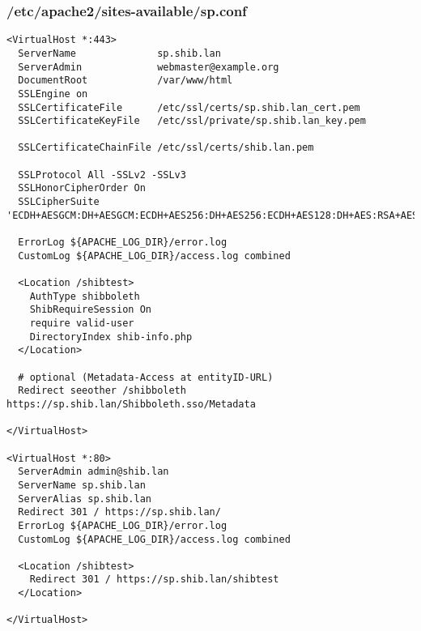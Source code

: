 \subsubsection{/etc/apache2/sites-available/sp.conf}
\begin{lstlisting}
<VirtualHost *:443>
  ServerName              sp.shib.lan
  ServerAdmin             webmaster@example.org
  DocumentRoot            /var/www/html
  SSLEngine on
  SSLCertificateFile      /etc/ssl/certs/sp.shib.lan_cert.pem
  SSLCertificateKeyFile   /etc/ssl/private/sp.shib.lan_key.pem
 
  SSLCertificateChainFile /etc/ssl/certs/shib.lan.pem
 
  SSLProtocol All -SSLv2 -SSLv3
  SSLHonorCipherOrder On
  SSLCipherSuite 'ECDH+AESGCM:DH+AESGCM:ECDH+AES256:DH+AES256:ECDH+AES128:DH+AES:RSA+AESGCM:RSA+AES:ECDH+3DES:DH+3DES:RSA+3DES:!aNULL:!eNULL:!LOW:!RC4:!MD5:!EXP:!PSK:!DSS:!SEED:!ECDSA:!CAMELLIA'

  ErrorLog ${APACHE_LOG_DIR}/error.log
  CustomLog ${APACHE_LOG_DIR}/access.log combined

  <Location /shibtest>
    AuthType shibboleth
    ShibRequireSession On
    require valid-user
    DirectoryIndex shib-info.php
  </Location>
 
  # optional (Metadata-Access at entityID-URL)
  Redirect seeother /shibboleth https://sp.shib.lan/Shibboleth.sso/Metadata
 
</VirtualHost>

<VirtualHost *:80>
  ServerAdmin admin@shib.lan
  ServerName sp.shib.lan
  ServerAlias sp.shib.lan 
  Redirect 301 / https://sp.shib.lan/
  ErrorLog ${APACHE_LOG_DIR}/error.log
  CustomLog ${APACHE_LOG_DIR}/access.log combined

  <Location /shibtest>
    Redirect 301 / https://sp.shib.lan/shibtest
  </Location>

</VirtualHost>
\end{lstlisting}

